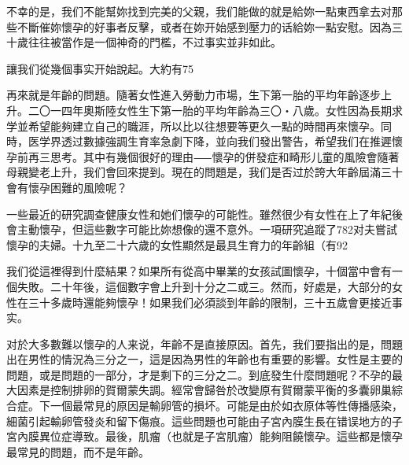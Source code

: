 \documentclass[12pt,UTF8]{ctexbook}
\begin{document}
不幸的是，我们不能幫妳找到完美的父親，我们能做的就是給妳一點東西拿去对那些不斷催妳懷孕的好事者反擊，或者在妳开始感到壓力的话給妳一點安慰。因為三十歲往往被當作是一個神奇的門檻，不过事实並非如此。

讓我们從幾個事实开始說起。大約有75%

再來就是年齡的問題。隨著女性進入勞動力市場，生下第一胎的平均年齡逐步上升。二〇一四年奧斯陸女性生下第一胎的平均年齡為三〇‧八歲。女性因為長期求学並希望能夠建立自己的職涯，所以比以往想要等更久一點的時間再來懷孕。同時，医学界透过數據強調生育率急劇下降，並向我们發出警告，希望我们在推遲懷孕前再三思考。其中有幾個很好的理由⸺懷孕的併發症和畸形儿童的風險會隨著母親變老上升，我们會回來提到。現在的問題是，我们是否过於誇大年齡屆滿三十會有懷孕困難的風險呢？

一些最近的研究調查健康女性和她们懷孕的可能性。雖然很少有女性在上了年紀後會主動懷孕，但這些數字可能比妳想像的還不意外。一項研究追蹤了782对夫嘗試懷孕的夫婦。十九至二十六歲的女性顯然是最具生育力的年齡組（有92%

我们從這裡得到什麼結果？如果所有從高中畢業的女孩試圖懷孕，十個當中會有一個失敗。二十年後，這個數字會上升到十分之二或三。然而，好處是，大部分的女性在三十多歲時還能夠懷孕！如果我们必須談到年齡的限制，三十五歲會更接近事实。

对於大多數難以懷孕的人来说，年齡不是直接原因。首先，我们要指出的是，問題出在男性的情況為三分之一，這是因為男性的年齡也有重要的影響。女性是主要的問題，或是問題的一部分，才是剩下的三分之二。到底發生什麼問題呢？不孕的最大因素是控制排卵的賀爾蒙失調。經常會歸咎於改變原有賀爾蒙平衡的多囊卵巢綜合症。下一個最常見的原因是輸卵管的損坏。可能是由於如衣原体等性傳播感染，細菌引起輸卵管發炎和留下傷痕。這些問題也可能由子宮內膜生長在错误地方的子宮內膜異位症導致。最後，肌瘤（也就是子宮肌瘤）能夠阻饒懷孕。這些都是懷孕最常見的問題，而不是年齡。
\end{document}
